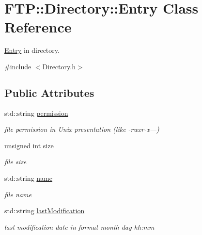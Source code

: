 \hypertarget{structFTP_1_1Directory_1_1Entry}{}\section{F\+T\+P\+:\+:Directory\+:\+:Entry Class Reference}
\label{structFTP_1_1Directory_1_1Entry}


\hyperlink{structFTP_1_1Directory_1_1Entry}{Entry} in directory.  




{\ttfamily \#include $<$Directory.\+h$>$}

\subsection*{Public Attributes}
\begin{DoxyCompactItemize}
\item 
\hypertarget{structFTP_1_1Directory_1_1Entry_aac9c20aeb62b9a48ebd1e8bfb897aabf}{}std\+::string \hyperlink{structFTP_1_1Directory_1_1Entry_aac9c20aeb62b9a48ebd1e8bfb897aabf}{permission}\label{structFTP_1_1Directory_1_1Entry_aac9c20aeb62b9a48ebd1e8bfb897aabf}

\begin{DoxyCompactList}\small\item\em file permission in Unix presentation (like -\/rwxr-\/x---) \end{DoxyCompactList}\item 
\hypertarget{structFTP_1_1Directory_1_1Entry_a75b6770d2c8fd215755a7ad5f3187e25}{}unsigned int \hyperlink{structFTP_1_1Directory_1_1Entry_a75b6770d2c8fd215755a7ad5f3187e25}{size}\label{structFTP_1_1Directory_1_1Entry_a75b6770d2c8fd215755a7ad5f3187e25}

\begin{DoxyCompactList}\small\item\em file size \end{DoxyCompactList}\item 
\hypertarget{structFTP_1_1Directory_1_1Entry_a7476d45d4a0267cbf9e708bbc5bdc3e1}{}std\+::string \hyperlink{structFTP_1_1Directory_1_1Entry_a7476d45d4a0267cbf9e708bbc5bdc3e1}{name}\label{structFTP_1_1Directory_1_1Entry_a7476d45d4a0267cbf9e708bbc5bdc3e1}

\begin{DoxyCompactList}\small\item\em file name \end{DoxyCompactList}\item 
\hypertarget{structFTP_1_1Directory_1_1Entry_adc85896558570dd9d34709848804ce78}{}std\+::string \hyperlink{structFTP_1_1Directory_1_1Entry_adc85896558570dd9d34709848804ce78}{last\+Modification}\label{structFTP_1_1Directory_1_1Entry_adc85896558570dd9d34709848804ce78}

\begin{DoxyCompactList}\small\item\em last modification date in format month day hh\+:mm \end{DoxyCompactList}\end{DoxyCompactItemize}


